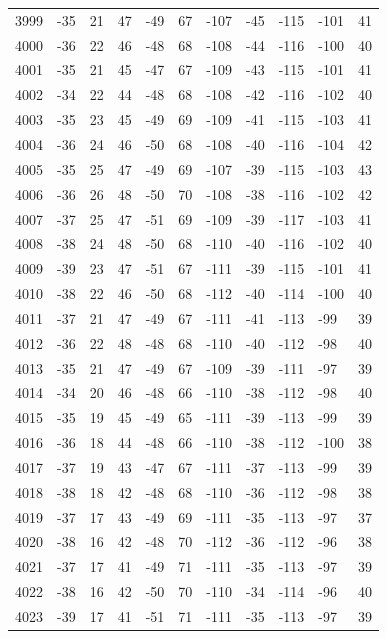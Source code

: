 \begin{table}[H]
\begin{tabular}{lllllllllll}
3999 & -35 & 21 & 47 & -49 & 67 & -107 & -45 & -115 & -101 & 41 \\
4000 & -36 & 22 & 46 & -48 & 68 & -108 & -44 & -116 & -100 & 40 \\
4001 & -35 & 21 & 45 & -47 & 67 & -109 & -43 & -115 & -101 & 41 \\
4002 & -34 & 22 & 44 & -48 & 68 & -108 & -42 & -116 & -102 & 40 \\
4003 & -35 & 23 & 45 & -49 & 69 & -109 & -41 & -115 & -103 & 41 \\
4004 & -36 & 24 & 46 & -50 & 68 & -108 & -40 & -116 & -104 & 42 \\
4005 & -35 & 25 & 47 & -49 & 69 & -107 & -39 & -115 & -103 & 43 \\
4006 & -36 & 26 & 48 & -50 & 70 & -108 & -38 & -116 & -102 & 42 \\
4007 & -37 & 25 & 47 & -51 & 69 & -109 & -39 & -117 & -103 & 41 \\
4008 & -38 & 24 & 48 & -50 & 68 & -110 & -40 & -116 & -102 & 40 \\
4009 & -39 & 23 & 47 & -51 & 67 & -111 & -39 & -115 & -101 & 41 \\
4010 & -38 & 22 & 46 & -50 & 68 & -112 & -40 & -114 & -100 & 40 \\
4011 & -37 & 21 & 47 & -49 & 67 & -111 & -41 & -113 & -99 & 39 \\
4012 & -36 & 22 & 48 & -48 & 68 & -110 & -40 & -112 & -98 & 40 \\
4013 & -35 & 21 & 47 & -49 & 67 & -109 & -39 & -111 & -97 & 39 \\
4014 & -34 & 20 & 46 & -48 & 66 & -110 & -38 & -112 & -98 & 40 \\
4015 & -35 & 19 & 45 & -49 & 65 & -111 & -39 & -113 & -99 & 39 \\
4016 & -36 & 18 & 44 & -48 & 66 & -110 & -38 & -112 & -100 & 38 \\
4017 & -37 & 19 & 43 & -47 & 67 & -111 & -37 & -113 & -99 & 39 \\
4018 & -38 & 18 & 42 & -48 & 68 & -110 & -36 & -112 & -98 & 38 \\
4019 & -37 & 17 & 43 & -49 & 69 & -111 & -35 & -113 & -97 & 37 \\
4020 & -38 & 16 & 42 & -48 & 70 & -112 & -36 & -112 & -96 & 38 \\
4021 & -37 & 17 & 41 & -49 & 71 & -111 & -35 & -113 & -97 & 39 \\
4022 & -38 & 16 & 42 & -50 & 70 & -110 & -34 & -114 & -96 & 40 \\
4023 & -39 & 17 & 41 & -51 & 71 & -111 & -35 & -113 & -97 & 39 \\

\end{tabular}
\end{table}
